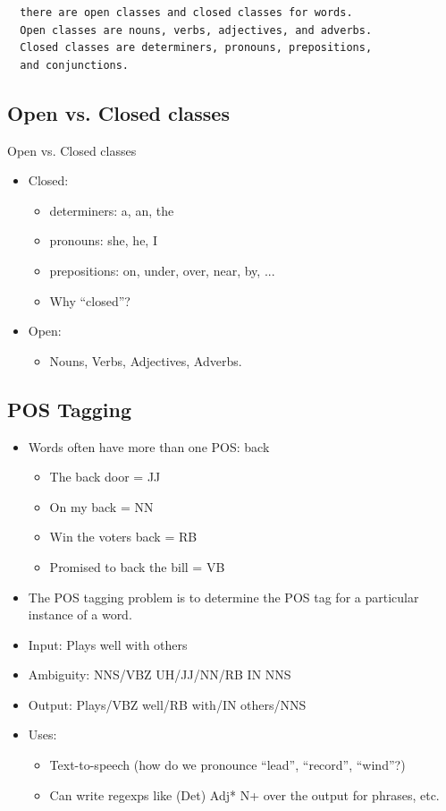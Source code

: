 \documentclass[11pt]{article}
\theoremstyle{definition}
\begin{document}
\begin{verbatim}
  there are open classes and closed classes for words. 
  Open classes are nouns, verbs, adjectives, and adverbs.
  Closed classes are determiners, pronouns, prepositions, 
  and conjunctions.
\end{verbatim}

\subsection{Open vs. Closed classes}
Open vs. Closed classes

\begin{itemize}
  \item Closed:
  \begin{itemize}
    \item determiners: a, an, the
    \item pronouns: she, he, I
    \item prepositions: on, under, over, near, by, ...
    \item Why “closed”?
  \end{itemize}
  \item Open:
  \begin{itemize}
    \item Nouns, Verbs, Adjectives, Adverbs.
  \end{itemize}
\end{itemize}

\subsection{POS Tagging}
\begin{itemize}
  \item Words often have more than one POS: back
  \begin{itemize}
    \item The back door = JJ
    \item On my back = NN
    \item Win the voters back = RB
    \item Promised to back the bill = VB
  \end{itemize}
  \item The POS tagging problem is to determine the POS tag for a
  particular instance of a word.
\end{itemize}
\begin{itemize}
  \item Input: Plays well with others
  \item Ambiguity: NNS/VBZ UH/JJ/NN/RB IN NNS
  \item Output: Plays/VBZ well/RB with/IN others/NNS
  \item Uses:
  \begin{itemize}
    \item Text-to-speech (how do we pronounce “lead”, “record”, “wind”?)
    \item Can write regexps like (Det) Adj* N+ over the output for phrases, etc.
  \end{itemize}
\end{itemize}
\end{document}
